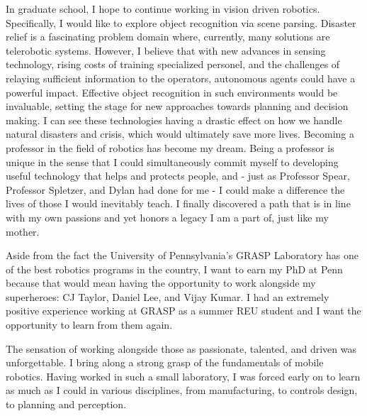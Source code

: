 \documentclass{article}
\begin{document}
In graduate school, I hope to continue working in vision driven robotics.
Specifically, I would like to explore object recognition via scene parsing.
Disaster relief is a fascinating problem domain where, currently, many
solutions are telerobotic systems. However, I believe that with new advances in
sensing technology, rising costs of training specialized personel, and the
challenges of relaying sufficient information to the operators, autonomous
agents could have a powerful impact. Effective object recognition in such
environments would be invaluable, setting the stage for new approaches towards
planning and decision making. I can see these technologies having a drastic
effect on how we handle natural disasters and crisis, which would ultimately
save more lives. Becoming a professor in the field of robotics has become my
dream. Being a professor is unique in the sense that I could simultaneously
commit myself to developing useful technology that helps and protects people,
and - just as Professor Spear, Professor Spletzer, and Dylan had done for me -
I could make a difference the lives of those I would inevitably teach. I
finally discovered a path that is in line with my own passions and yet honors a
legacy I am a part of, just like my mother.

Aside from the fact the University of Pennsylvania’s GRASP Laboratory has one
of the best robotics programs in the country, I want to earn my PhD at Penn
because that would mean having the opportunity to work alongside my
superheroes: CJ Taylor, Daniel Lee, and Vijay Kumar. I had an extremely
positive experience working at GRASP as a summer REU student and I want the
opportunity to learn from them again. 

The sensation of working alongside those as passionate, talented, and driven
was unforgettable.  I bring along a strong grasp of the fundamentals of mobile
robotics. Having worked in such a small laboratory, I was forced early on to
learn as much as I could in various disciplines, from manufacturing, to
controls design, to planning and perception. 
\end{document}
